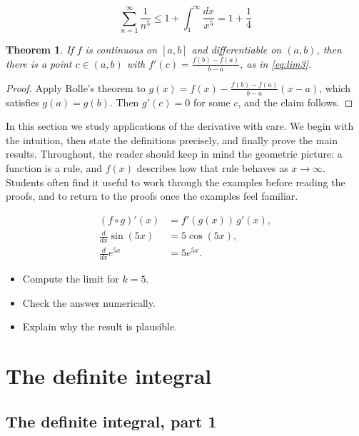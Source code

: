 \documentclass[11pt]{article}
\newtheorem{theorem}{Theorem}[section]
\begin{document}
\[
  \sum_{n=1}^{\infty} \frac{1}{n^{5}} \le 1 + \int_1^{\infty} \frac{dx}{x^{5}} = 1 + \frac{1}{4}
\]

\begin{theorem}
If $f$ is continuous on $[a,b]$ and differentiable on $(a,b)$, then there is a point $c \in (a,b)$ with $f'(c) = \frac{f(b)-f(a)}{b-a}$, as in \eqref{eq:lim3}.
\end{theorem}

\begin{proof}
Apply Rolle's theorem to $g(x) = f(x) - \frac{f(b)-f(a)}{b-a}(x-a)$, which satisfies $g(a) = g(b)$. Then $g'(c) = 0$ for some $c$, and the claim follows.
\end{proof}

In this section we study applications of the derivative with care. We begin with the intuition, then state the definitions precisely, and finally prove the main results. Throughout, the reader should keep in mind the geometric picture: a function is a rule, and $f(x)$ describes how that rule behaves as $x \to \infty$. Students often find it useful to work through the examples before reading the proofs, and to return to the proofs once the examples feel familiar. 

\begin{align*}
  (f \circ g)'(x) &= f'(g(x))\, g'(x), \\
  \frac{d}{dx} \sin(5 x) &= 5 \cos(5 x), \\
  \frac{d}{dx} e^{5 x} &= 5 e^{5 x}.
\end{align*}

\begin{itemize}
  \item Compute the limit for $k = 5$.
  \item Check the answer numerically.
  \item Explain why the result is plausible.
\end{itemize}

\section{The definite integral}

\subsection{The definite integral, part 1}
\end{document}
